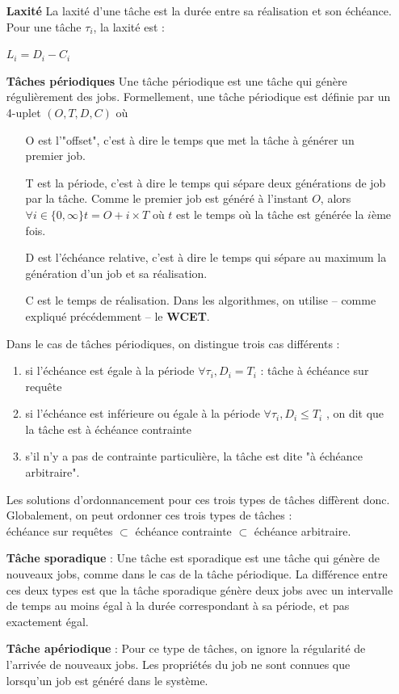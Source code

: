 \documentclass[11pt,a4paper,oneside]{report}
\begin{document}
\begin{itemize}
	\item[\textbf{Laxité}] La laxité d'une tâche est la durée entre sa réalisation et son échéance. 
	Pour une tâche $\tau_i$, la laxité est :
	\begin{center}
		$L_i = D_i - C_i$
	\end{center}
\vspace{0.5cm}
	\item[\textbf{Tâches périodiques}]
	Une tâche périodique est une tâche qui génère régulièrement des jobs.  
Formellement, une tâche périodique est définie par un 4-uplet $(O, T, D, C)$ où 
\begin{itemize}
	\item[O] est l'"offset", c'est à dire le temps que met la tâche à générer un premier job.
	\item[T] est la période, c'est à dire le temps qui sépare deux générations de job par la tâche. 
	Comme le premier job est généré à l'instant $O$, alors $\forall i \in \{0, \infty \} t = O + i\times T$ 
	où $t$ est le temps où la tâche est générée la $i$ème fois.
	\item[D] est l'échéance relative, c'est à dire le temps qui sépare au maximum la génération 
	d'un job et sa réalisation.
	\item[C] est le temps de réalisation. Dans les algorithmes, on utilise -- comme expliqué précédemment -- le \textbf{WCET}.
\end{itemize}	
	Dans le cas de tâches périodiques, on distingue trois cas différents : \\
	\begin{enumerate}
		\item si l'échéance est égale à la période $\forall \tau_i, D_i = T_i$ : tâche à \label{echeancesurrequete}échéance sur requête
		\item si l'échéance est inférieure ou égale à la période $\forall \tau_i, D_i \leq T_i $ , on dit que la tâche est à \label{echeancecontrainte} échéance contrainte
		\item s'il n'y a pas de contrainte particulière, la tâche est dite "à échéance arbitraire".
	\end{enumerate}
	Les solutions d'ordonnancement pour ces trois types de tâches diffèrent donc. 
	Globalement, on peut ordonner ces trois types de tâches : \\
	échéance sur requêtes $\subset$ échéance contrainte $\subset$ échéance arbitraire.
	
	\item[\textbf{Tâche sporadique}] : Une tâche est sporadique est une tâche qui génère de nouveaux jobs, 
	comme dans le cas de la tâche périodique. 
	La différence entre ces deux types est que la tâche sporadique 
	génère deux jobs avec un intervalle de temps au moins égal à la durée correspondant à sa période, 
	et pas exactement égal. 
	
	\item[\textbf{Tâche apériodique}] : Pour ce type de tâches, on ignore la régularité de 
	l'arrivée de nouveaux jobs. Les propriétés du job ne sont connues que lorsqu'un job est 
	généré dans le système.
	
\end{itemize}
\end{document}
